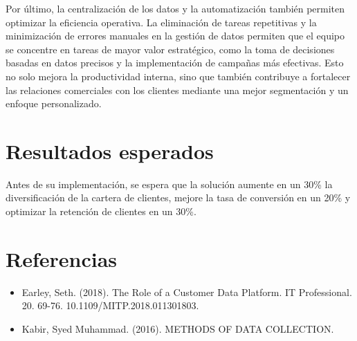 \documentclass[12pt]{article}
\begin{document}
Por último, la centralización de los datos y la automatización también permiten optimizar la eficiencia operativa. La eliminación de tareas repetitivas y la minimización de errores manuales en la gestión de datos permiten que el equipo se concentre en tareas de mayor valor estratégico, como la toma de decisiones basadas en datos precisos y la implementación de campañas más efectivas. Esto no solo mejora la productividad interna, sino que también contribuye a fortalecer las relaciones comerciales con los clientes mediante una mejor segmentación y un enfoque personalizado.




\newpage

\section{Resultados esperados}
Antes de su implementación, se espera que la solución aumente en un 30\% la diversificación de la cartera de clientes, mejore la tasa de conversión en un 20\% y optimizar la retención de clientes en un 30\%.

\section{Referencias}
\begin{itemize}
    \item Earley, Seth. (2018). The Role of a Customer Data Platform. IT Professional. 20. 69-76. 10.1109/MITP.2018.011301803.
    \item Kabir, Syed Muhammad. (2016). METHODS OF DATA COLLECTION.
\end{itemize}
\end{document}

